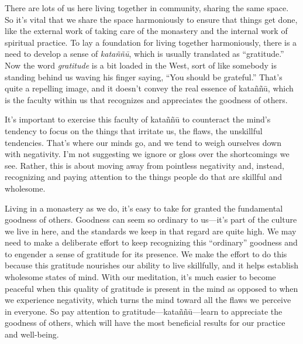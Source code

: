 
There are lots of us here living together in community, sharing the 
same space. So it's vital that we share the space harmoniously to 
ensure that things get done, like the external work of taking care of 
the monastery and the internal work of spiritual practice. To lay a 
foundation for living together harmoniously, there is a need to develop 
a sense of \emph{kataññū}, which is usually translated as 
``gratitude.'' Now the word \emph{gratitude} is a bit loaded in the 
West, sort of like somebody is standing behind us waving his finger 
saying, ``You should be grateful.'' That's quite a repelling image, and 
it doesn't convey the real essence of kataññū, which is the faculty 
within us that recognizes and appreciates the goodness of others.

It's important to exercise this faculty of kataññū to counteract the 
mind's tendency to focus on the things that irritate us, the flaws, the 
unskillful tendencies. That's where our minds go, and we tend to weigh 
ourselves down with negativity. I'm not suggesting we ignore or gloss 
over the shortcomings we see. Rather, this is about moving away from 
pointless negativity and, instead, recognizing and paying attention to 
the things people do that are skillful and wholesome.

Living in a monastery as we do, it's easy to take for granted the 
fundamental goodness of others. Goodness can seem so ordinary to 
us---it's part of the culture we live in here, and the standards we 
keep in that regard are quite high. We may need to make a deliberate 
effort to keep recognizing this ``ordinary'' goodness and to engender a 
sense of gratitude for its presence. We make the effort to do this 
because this gratitude nourishes our ability to live skillfully, and it 
helps establish wholesome states of mind. With our meditation, it's 
much easier to become peaceful when this quality of gratitude is 
present in the mind as opposed to when we experience negativity, which 
turns the mind toward all the flaws we perceive in everyone. So pay 
attention to gratitude---kataññū---learn to appreciate the goodness 
of others, which will have the most beneficial results for our practice 
and well-being.


